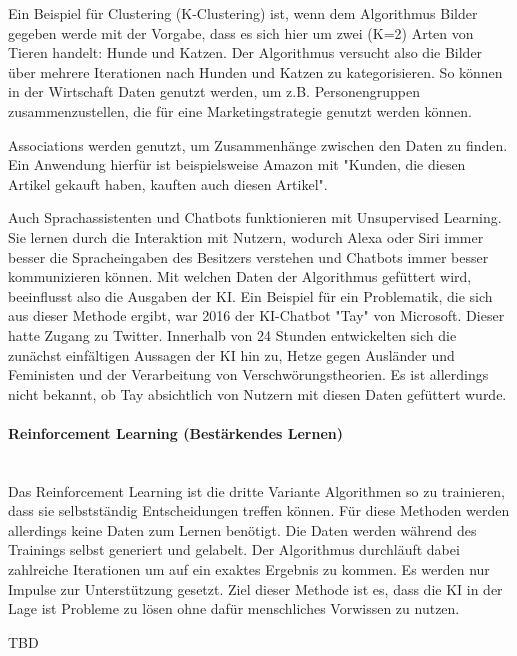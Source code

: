 \documentclass[a4paper,12pt, german]{report}
\begin{document}
Ein Beispiel für Clustering (K-Clustering) ist, wenn dem Algorithmus Bilder gegeben werde mit der Vorgabe, dass es sich hier um zwei (K=2) Arten von Tieren handelt: Hunde und Katzen. Der Algorithmus versucht also die Bilder über mehrere Iterationen nach Hunden und Katzen zu kategorisieren. So können in der Wirtschaft Daten genutzt werden, um z.B. Personengruppen zusammenzustellen, die für eine Marketingstrategie genutzt werden können.

Associations werden genutzt, um Zusammenhänge zwischen den Daten zu finden. Ein Anwendung hierfür ist beispielsweise Amazon mit "Kunden, die diesen Artikel gekauft haben, kauften auch diesen Artikel".

Auch Sprachassistenten und Chatbots funktionieren mit Unsupervised Learning. Sie lernen durch die Interaktion mit Nutzern, wodurch Alexa oder Siri immer besser die Spracheingaben des Besitzers verstehen und Chatbots immer besser kommunizieren können. Mit welchen Daten der Algorithmus gefüttert wird, beeinflusst also die Ausgaben der KI. Ein Beispiel für ein Problematik, die sich aus dieser Methode ergibt, war 2016 der KI-Chatbot "Tay" von Microsoft. Dieser hatte Zugang zu Twitter. Innerhalb von 24 Stunden entwickelten sich die zunächst einfältigen Aussagen der KI hin zu, Hetze gegen Ausländer und Feministen und der Verarbeitung von Verschwörungstheorien. Es ist allerdings nicht bekannt, ob Tay absichtlich von Nutzern mit diesen Daten gefüttert wurde. 

\paragraph{Reinforcement Learning (Bestärkendes Lernen)} $ $ \\ Das Reinforcement Learning ist die dritte Variante Algorithmen so zu trainieren, dass sie selbstständig Entscheidungen treffen können. Für diese Methoden werden allerdings keine Daten zum Lernen benötigt. Die Daten werden während des Trainings selbst generiert und gelabelt. Der Algorithmus durchläuft dabei zahlreiche Iterationen um auf ein exaktes Ergebnis zu kommen. Es werden nur Impulse zur Unterstützung gesetzt. Ziel dieser Methode ist es, dass die KI in der Lage ist Probleme zu lösen ohne dafür menschliches Vorwissen zu nutzen.

TBD




\end{document}
